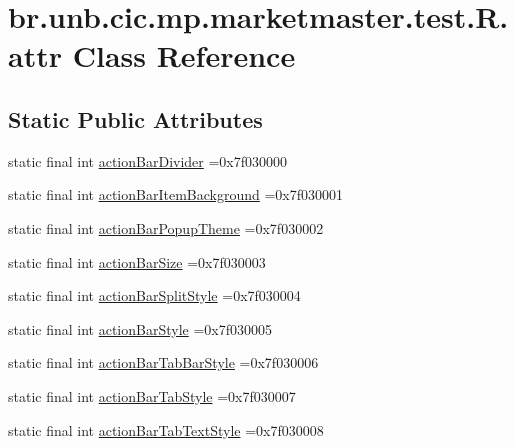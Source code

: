 \hypertarget{classbr_1_1unb_1_1cic_1_1mp_1_1marketmaster_1_1test_1_1R_1_1attr}{}\section{br.\+unb.\+cic.\+mp.\+marketmaster.\+test.\+R.\+attr Class Reference}
\label{classbr_1_1unb_1_1cic_1_1mp_1_1marketmaster_1_1test_1_1R_1_1attr}
\subsection*{Static Public Attributes}
\begin{DoxyCompactItemize}
\item 
static final int \mbox{\hyperlink{classbr_1_1unb_1_1cic_1_1mp_1_1marketmaster_1_1test_1_1R_1_1attr_aa7b00db0042be84a7bdbf4e1c4deaa11}{action\+Bar\+Divider}} =0x7f030000
\item 
static final int \mbox{\hyperlink{classbr_1_1unb_1_1cic_1_1mp_1_1marketmaster_1_1test_1_1R_1_1attr_ab78c9aa2f395a09e3453e30ec0b7db7f}{action\+Bar\+Item\+Background}} =0x7f030001
\item 
static final int \mbox{\hyperlink{classbr_1_1unb_1_1cic_1_1mp_1_1marketmaster_1_1test_1_1R_1_1attr_a16148b174f6796d44d6cc1c1fb798ad9}{action\+Bar\+Popup\+Theme}} =0x7f030002
\item 
static final int \mbox{\hyperlink{classbr_1_1unb_1_1cic_1_1mp_1_1marketmaster_1_1test_1_1R_1_1attr_a6a2aed192f97448ee40e6ee51c759d72}{action\+Bar\+Size}} =0x7f030003
\item 
static final int \mbox{\hyperlink{classbr_1_1unb_1_1cic_1_1mp_1_1marketmaster_1_1test_1_1R_1_1attr_aa12d46defdb7f9b9fad8ae85a56d0362}{action\+Bar\+Split\+Style}} =0x7f030004
\item 
static final int \mbox{\hyperlink{classbr_1_1unb_1_1cic_1_1mp_1_1marketmaster_1_1test_1_1R_1_1attr_a2cb9d188b6a034a007ab0f230d8eff15}{action\+Bar\+Style}} =0x7f030005
\item 
static final int \mbox{\hyperlink{classbr_1_1unb_1_1cic_1_1mp_1_1marketmaster_1_1test_1_1R_1_1attr_a171c4848c6ed6166cbf51207285c13ff}{action\+Bar\+Tab\+Bar\+Style}} =0x7f030006
\item 
static final int \mbox{\hyperlink{classbr_1_1unb_1_1cic_1_1mp_1_1marketmaster_1_1test_1_1R_1_1attr_aa71128242e4b515dd1921a5b2be01aba}{action\+Bar\+Tab\+Style}} =0x7f030007
\item 
static final int \mbox{\hyperlink{classbr_1_1unb_1_1cic_1_1mp_1_1marketmaster_1_1test_1_1R_1_1attr_a2a985a206a2238502421f66393cf7c00}{action\+Bar\+Tab\+Text\+Style}} =0x7f030008

\end{DoxyCompactItemize}
